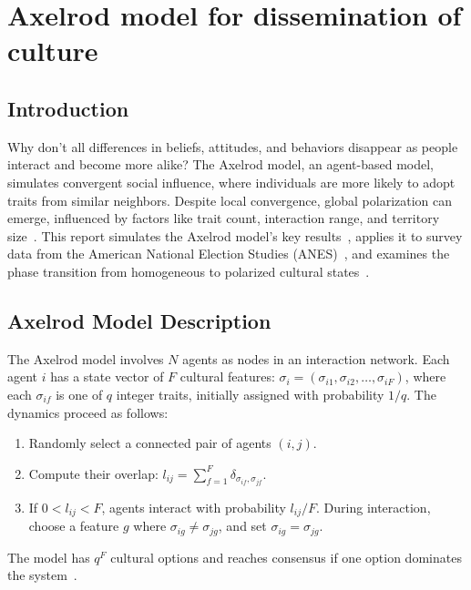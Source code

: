 \chapter{Axelrod model for dissemination of culture}



\section{Introduction}

Why don’t all differences in beliefs, attitudes, and behaviors disappear as people interact and become more alike? The Axelrod model, an agent-based model, simulates convergent social influence, where individuals are more likely to adopt traits from similar neighbors. Despite local convergence, global polarization can emerge, influenced by factors like trait count, interaction range, and territory size~\cite{axelrod1997dissemination}. This report simulates the Axelrod model’s key results~\cite{axelrod1997dissemination}, applies it to survey data from the American National Election Studies (ANES)~\cite{anes2025timeseries}, and examines the phase transition from homogeneous to polarized cultural states~\cite{PhysRevLett.85.3536}.

\section{Axelrod Model Description}

The Axelrod model involves $N$ agents as nodes in an interaction network. Each agent $i$ has a state vector of $F$ cultural features: $\sigma_i = (\sigma_{i1}, \sigma_{i2}, \ldots, \sigma_{iF})$, where each $\sigma_{if}$ is one of $q$ integer traits, initially assigned with probability $1/q$. The dynamics proceed as follows:
\begin{enumerate}
    \item Randomly select a connected pair of agents $(i,j)$.
    \item Compute their overlap: $l_{ij} = \sum_{f=1}^{F} \delta_{\sigma_{if}, \sigma_{jf}}$.
    \item If $0 < l_{ij} < F$, agents interact with probability $l_{ij}/F$. During interaction, choose a feature $g$ where $\sigma_{ig} \neq \sigma_{jg}$, and set $\sigma_{ig} = \sigma_{jg}$.
\end{enumerate}
The model has $q^F$ cultural options and reaches consensus if one option dominates the system~\cite{PhysRevLett.85.3536}.


